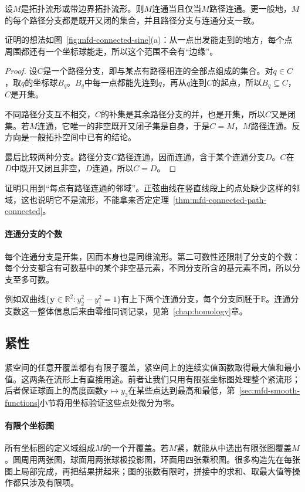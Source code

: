 \begin{theorem}[流形上连通与路径连通等价]
\label{thm:mfd-connected-path-connected}
设$M$是拓扑流形或带边界拓扑流形。则$M$连通当且仅当$M$路径连通。更一般地，$M$的每个路径分支都是既开又闭的集合，并且路径分支与连通分支一致。
\end{theorem}

证明的想法如图~\ref{fig:mfd-connected-sine}(a)：从一点出发能走到的地方，每个点周围都还有一个坐标球能走，所以这个范围不会有“边缘”。

\begin{proof}
设$C$是一个路径分支，即与某点有路径相连的全部点组成的集合。对$q\in C$，取$q$的坐标球$B_q$。$B_q$中每一点都能先连到$q$，再从$q$连到$C$的起点，所以$B_q\subseteq C$，$C$是开集。

不同路径分支互不相交，$C$的补集是其余路径分支的并，也是开集，所以$C$又是闭集。若$M$连通，它唯一的非空既开又闭子集是自身，于是$C=M$，$M$路径连通。反方向是一般拓扑空间中已有的结论。

最后比较两种分支。路径分支$C$路径连通，因而连通，含于某个连通分支$D$。$C$在$D$中既开又闭且非空，$D$连通，所以$C=D$。
\end{proof}

证明只用到“每点有路径连通的邻域”。正弦曲线在竖直线段上的点处缺少这样的邻域，这也说明它不是流形，不能拿来否定定理~\ref{thm:mfd-connected-path-connected}。

\paragraph{连通分支的个数}
每个连通分支是开集，因而本身也是同维流形。第二可数性还限制了分支的个数：每个分支都含有可数基中的某个非空基元素，不同分支所含的基元素不同，所以分支至多可数。

例如双曲线$\{\bm y\in\mathbb R^2:y_2^2-y_1^2=1\}$有上下两个连通分支，每个分支同胚于$\mathbb R$。连通分支数这一整体信息后来由零维同调记录，见第~\ref{chap:homology}章。

\subsection{紧性}
\label{sec:mfd-compactness}

紧空间的任意开覆盖都有有限子覆盖，紧空间上的连续实值函数取得最大值和最小值。这两条在流形上有直接用途。前者让我们只用有限张坐标图处理整个紧流形；后者保证球面上的高度函数$\bm y\mapsto y_3$在某些点达到最高和最低，第~\ref{sec:mfd-smooth-functions}小节将用坐标验证这些点处微分为零。

\paragraph{有限个坐标图}
所有坐标图的定义域组成$M$的一个开覆盖。若$M$紧，就能从中选出有限张图覆盖$M$。圆周用两张图，球面用两张球极投影图，环面用四张乘积图。很多构造先在每张图上局部完成，再把结果拼起来；图的张数有限时，拼接中的求和、取最大值等操作都只涉及有限项。

